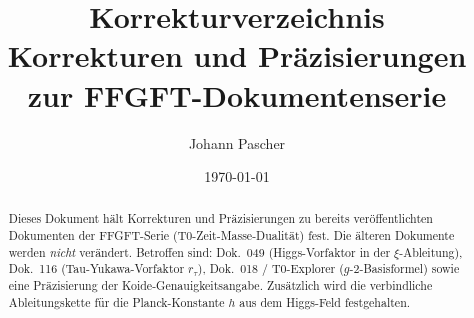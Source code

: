 

\title{Korrekturverzeichnis\\
\large Korrekturen und Pr\"azisierungen zur FFGFT-Dokumentenserie}
\author{Johann Pascher}
\date{\today}


\maketitle

\begin{abstract}
\noindent
Dieses Dokument h\"alt Korrekturen und Pr\"azisierungen zu bereits
ver\"offentlichten Dokumenten der FFGFT-Serie (T0-Zeit-Masse-Dualit\"at)
fest. Die \"alteren Dokumente werden \emph{nicht} ver\"andert.
Betroffen sind: Dok.~049 (Higgs-Vorfaktor in der $\xi$-Ableitung),
Dok.~116 (Tau-Yukawa-Vorfaktor $r_\tau$), Dok.~018 / T0-Explorer
($g$-$2$-Basisformel) sowie eine Pr\"azisierung der Koide-Genauigkeitsangabe.
Zus\"atzlich wird die verbindliche Ableitungskette f\"ur die Planck-Konstante
$h$ aus dem Higgs-Feld festgehalten.
\end{abstract}

\tableofcontents
\bigskip




